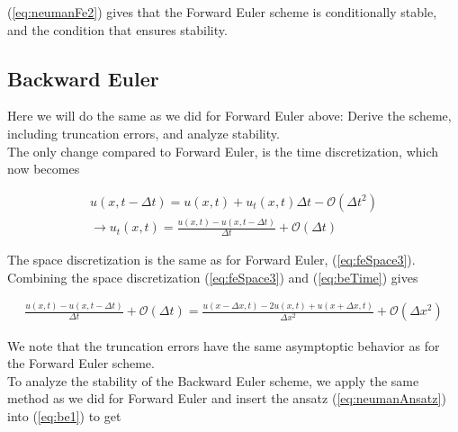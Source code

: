 \documentclass{article}
\begin{document}
(\ref{eq:neumanFe2}) gives that the Forward Euler scheme is conditionally stable, and the condition that ensures stability.


\subsection{Backward Euler}
Here we will do the same as we did for Forward Euler above: Derive the scheme, including truncation errors, and analyze stability.\\

The only change compared to Forward Euler, is the time discretization, which now becomes

\begin{subequations}
	\begin{align}
	u(x, t- \Delta t)  = u(x,t) +  u_t(x,t) \Delta t - \mathcal{O}(\Delta t^2)\\
	\rightarrow u_t(x,t) = \frac{u(x, t) - u(x,t - \Delta t)}{\Delta t} + \mathcal{O}(\Delta t)\label{eq:beTime}
	\end{align}
\end{subequations}

The space discretization is the same as for Forward Euler, (\ref{eq:feSpace3}). Combining the space discretization (\ref{eq:feSpace3}) and (\ref{eq:beTime}) gives

\begin{subequations}
	\begin{align}
		\frac{u(x, t) - u(x,t - \Delta t)}{\Delta t} + \mathcal{O}(\Delta t) = \frac{u(x - \Delta x, t) - 2u(x,t) + u(x+ \Delta x, t)}{\Delta x^2} + \mathcal{O}(\Delta x^2)\label{eq:be1}
	\end{align}
\end{subequations}

We note that the truncation errors have the same asymptoptic behavior as for the Forward Euler scheme. \\

To analyze the stability of the Backward Euler scheme, we apply the same method as we did for Forward Euler and insert the ansatz (\ref{eq:neumanAnsatz}) into (\ref{eq:be1}) to get
\end{document}
